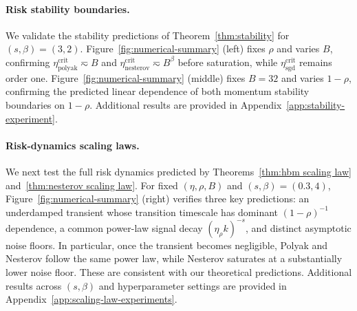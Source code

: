 \documentclass[11pt]{article}
\newcommand{\sgd}{\mathrm{sgd}}
\newcommand{\polyak}{\mathrm{polyak}}
\newcommand{\nesterov}{\mathrm{nesterov}}
\newcommand{\crit}{\mathrm{crit}}
\begin{document}
\paragraph{Risk stability boundaries.}
We validate the stability predictions of Theorem~\ref{thm:stability} for \((s,\beta)=(3,2)\). Figure~\ref{fig:numerical-summary} (left) fixes \(\rho\) and varies \(B\), confirming \(\eta_\polyak^\crit\eqsim B\) and \(\eta_\nesterov^\crit\eqsim B^\beta\) before saturation, while $\eta_{\sgd}^{\crit}$ remains order one. Figure~\ref{fig:numerical-summary} (middle) fixes \(B=32\) and varies \(1-\rho\), confirming the predicted linear dependence of both momentum stability boundaries on \(1-\rho\). Additional results are provided in Appendix~\ref{app:stability-experiment}.

\paragraph{Risk-dynamics scaling laws.}
We next test the full risk dynamics predicted by Theorems~\ref{thm:hbm scaling law} and~\ref{thm:nesterov scaling law}. For fixed \((\eta,\rho,B)\) and \((s,\beta)=(0.3,4)\), Figure~\ref{fig:numerical-summary} (right) verifies three key predictions: an underdamped transient whose transition timescale has dominant $(1-\rho)^{-1}$ dependence, a common power-law signal decay \((\eta_\rho k)^{-s}\), and distinct asymptotic noise floors. In particular, once the transient becomes negligible, Polyak and Nesterov follow the same power law, while Nesterov saturates at a substantially lower noise floor. These are consistent with our theoretical predictions.
 Additional results across \((s,\beta)\) and hyperparameter settings are provided in Appendix~\ref{app:scaling-law-experiments}.
\end{document}
